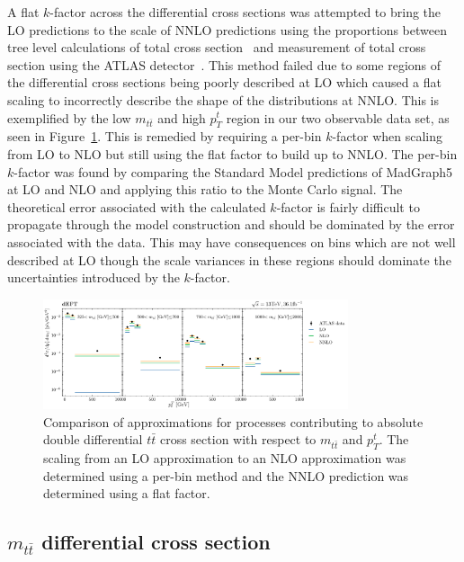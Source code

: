 \documentclass[a4paper,11pt]{article}
\begin{document}
A flat $k$-factor across the differential cross sections was attempted to bring the LO predictions to the scale of NNLO predictions using the proportions between tree level calculations of total cross section~\cite{Alwall_2014} and measurement of total cross section using the ATLAS detector~\cite{ATLAS:2019hxz}.
This method failed due to some regions of the differential cross sections being poorly described at LO which caused a flat scaling to incorrectly describe the shape of the distributions at NNLO.
This is exemplified by the low $m_{t\bar{t}}$ and high $p_{T}^{t}$ region in our two observable data set, as seen in Figure~\ref{fig:kfactor}.
This is remedied by requiring a per-bin $k$-factor when scaling from LO to NLO but still using the flat factor to build up to NNLO.
The per-bin $k$-factor was found by comparing the Standard Model predictions of MadGraph5 at LO and NLO and applying this ratio to the Monte Carlo signal.
The theoretical error associated with the calculated $k$-factor is fairly difficult to propagate through the model construction and should be dominated by the error associated with the data.
This may have consequences on bins which are not well described at LO though the scale variances in these regions should dominate the uncertainties introduced by the $k$-factor.

\begin{figure}[H]
    \centering
    \includegraphics[width=0.8\textwidth]{plots/k_factor.png}
    \caption{Comparison of approximations for processes contributing to absolute double differential $t\bar{t}$ cross section with respect to $m_{t\bar{t}}$ and $p_{T}^{t}$. The scaling from an LO approximation to an NLO approximation was determined using a per-bin method and the NNLO prediction was determined using a flat factor.}
    \label{fig:kfactor}
\end{figure}


\subsection{\texorpdfstring{$m_{t\bar{t}}$}{mttbar} differential cross section}
\end{document}
